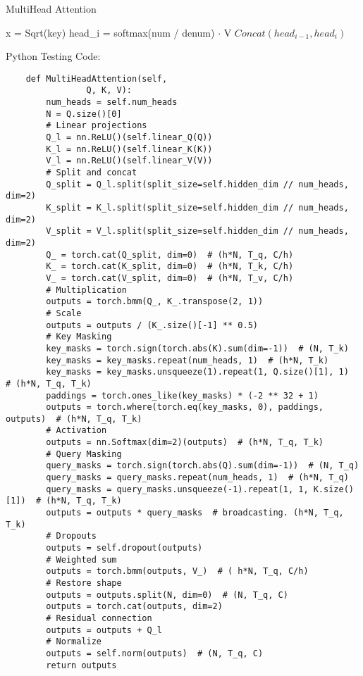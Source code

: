 \documentclass{article}
\begin{document}
\begin{algorithm}
    \caption{MultiHead Attention}
    \begin{algorithmic}[1]
            \State x = Sqrt(key)
            \State head_i =  softmax(num / denum) $\cdot$ V
        \EndFor{}
       \State $Concat(head_{i-1},head_i)$
    \EndFor{}
    \State {}

    \end{algorithmic}
\end{algorithm}
Python Testing Code:
\begin{lstlisting}
    def MultiHeadAttention(self,
                Q, K, V):
        num_heads = self.num_heads
        N = Q.size()[0]
        # Linear projections
        Q_l = nn.ReLU()(self.linear_Q(Q))
        K_l = nn.ReLU()(self.linear_K(K))
        V_l = nn.ReLU()(self.linear_V(V))
        # Split and concat
        Q_split = Q_l.split(split_size=self.hidden_dim // num_heads, dim=2)
        K_split = K_l.split(split_size=self.hidden_dim // num_heads, dim=2)
        V_split = V_l.split(split_size=self.hidden_dim // num_heads, dim=2)
        Q_ = torch.cat(Q_split, dim=0)  # (h*N, T_q, C/h)
        K_ = torch.cat(K_split, dim=0)  # (h*N, T_k, C/h)
        V_ = torch.cat(V_split, dim=0)  # (h*N, T_v, C/h)
        # Multiplication
        outputs = torch.bmm(Q_, K_.transpose(2, 1))
        # Scale
        outputs = outputs / (K_.size()[-1] ** 0.5)
        # Key Masking
        key_masks = torch.sign(torch.abs(K).sum(dim=-1))  # (N, T_k)
        key_masks = key_masks.repeat(num_heads, 1)  # (h*N, T_k)
        key_masks = key_masks.unsqueeze(1).repeat(1, Q.size()[1], 1)  # (h*N, T_q, T_k)
        paddings = torch.ones_like(key_masks) * (-2 ** 32 + 1)
        outputs = torch.where(torch.eq(key_masks, 0), paddings, outputs)  # (h*N, T_q, T_k)
        # Activation
        outputs = nn.Softmax(dim=2)(outputs)  # (h*N, T_q, T_k)
        # Query Masking
        query_masks = torch.sign(torch.abs(Q).sum(dim=-1))  # (N, T_q)
        query_masks = query_masks.repeat(num_heads, 1)  # (h*N, T_q)
        query_masks = query_masks.unsqueeze(-1).repeat(1, 1, K.size()[1])  # (h*N, T_q, T_k)
        outputs = outputs * query_masks  # broadcasting. (h*N, T_q, T_k)
        # Dropouts
        outputs = self.dropout(outputs)
        # Weighted sum
        outputs = torch.bmm(outputs, V_)  # ( h*N, T_q, C/h)
        # Restore shape
        outputs = outputs.split(N, dim=0)  # (N, T_q, C)
        outputs = torch.cat(outputs, dim=2)
        # Residual connection
        outputs = outputs + Q_l
        # Normalize
        outputs = self.norm(outputs)  # (N, T_q, C)
        return outputs

\end{lstlisting}
\clearpage
\end{document}
